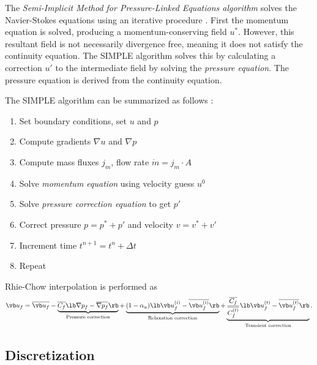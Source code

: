 \documentclass[12pt]{article}
\begin{document}
The \textit{Semi-Implicit Method for Pressure-Linked Equations algorithm} solves the Navier-Stokes equations using an iterative procedure \cite{pat}. First the momentum equation is solved, producing a momentum-conserving field $u^*$. However, this resultant field is not necessarily divergence free, meaning it does not satisfy the continuity equation. The SIMPLE algorithm solves this by calculating a correction $u'$ to the intermediate field by solving the \textit{pressure equation}. The pressure equation is derived from the continuity equation.

The SIMPLE algorithm can be summarized as follows \cite{mou, pat}:
\begin{enumerate}
\item Set boundary conditions, set $u$ and $p$
\item Compute gradients $\nabla u$ and $\nabla p$
\item Compute mass fluxes $j_m$, flow rate $\dot m = j_m \cdot A$
\item Solve \textit{momentum equation} using velocity guess $u^0$
\item Solve \textit{pressure correction equation} to get $p'$
\item Correct pressure $p = p^* + p'$ and velocity $v = v^* + v'$
\item Increment time $t^{n+1} = t^n + \Delta t$
\item Repeat
\end{enumerate}
Rhie-Chow interpolation is performed as \cite{mou}
$$
\vb u_f = \overline{\vb u_f} - \underbrace{\overline{C_f} \lb \nabla p_f - \overline{\nabla p_f} \rb}_\text{Pressure correction} + \underbrace{(1 - \alpha_u) \lb \vb u_f^{(i)} - \overline{\vb u_f^{(i)}} \rb}_\text{Relaxation correction} + \underbrace{\frac{\overline{C_f}}{\overline{C_f^{(t)}}} \lb \vb u_f^{(t)} - \overline{\vb u_f^{(t)}} \rb}_\text{Transient correction}.
$$

\subsection{Discretization}
\end{document}
